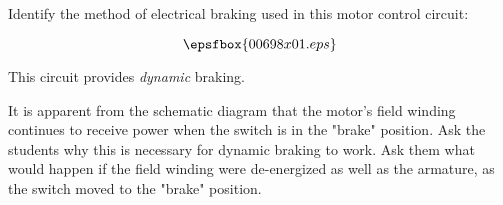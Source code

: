 

Identify the method of electrical braking used in this motor control circuit:

$$\epsfbox{00698x01.eps}$$







This circuit provides {\it dynamic} braking.







It is apparent from the schematic diagram that the motor's field winding continues to receive power when the switch is in the "brake" position.  Ask the students why this is necessary for dynamic braking to work.  Ask them what would happen if the field winding were de-energized as well as the armature, as the switch moved to the "brake" position.




